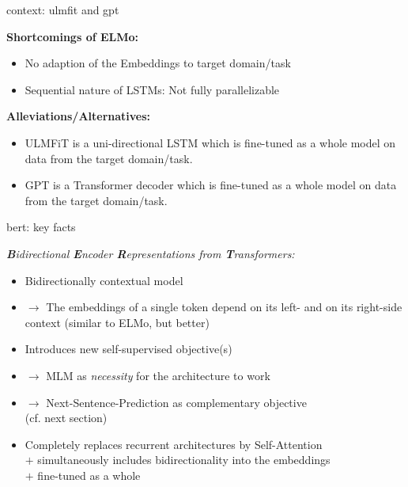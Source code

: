 \begin{frame}{context: ulmfit and gpt}

\vfill

	\textbf{Shortcomings of ELMo:}

	\begin{itemize}
		\item No adaption of the Embeddings to target domain/task
		\item Sequential nature of LSTMs: Not fully parallelizable 
	\end{itemize}

	\vspace{.3cm}
	
	\textbf{Alleviations/Alternatives:}

	\begin{itemize}
		\item ULMFiT  is a uni-directional LSTM which is fine-tuned as a whole model on data from the target domain/task.
		\item GPT  is a Transformer decoder which is fine-tuned as a whole model on data from the target domain/task.
	\end{itemize}
	
\vfill


\end{frame}


\begin{vbframe}{bert: key facts}

\vfill

\textit{\textbf{B}idirectional \textbf{E}ncoder \textbf{R}epresentations from \textbf{T}ransformers:}

\begin{itemize}
		\item Bidirectionally contextual model
		\item[] $\to$ The embeddings of a single token depend on its left- and on its right-side context (similar to ELMo, but better)
		\item Introduces new self-supervised objective(s)
		\item[] $\to$ MLM as \textit{necessity} for the architecture to work
		\item[] $\to$ Next-Sentence-Prediction as complementary objective\\(cf. next section)
		\item Completely replaces recurrent architectures by Self-Attention\\
					$+$ simultaneously includes bidirectionality into the embeddings\\
					$+$ fine-tuned as a whole					
\end{itemize}

\vfill

\end{vbframe}

